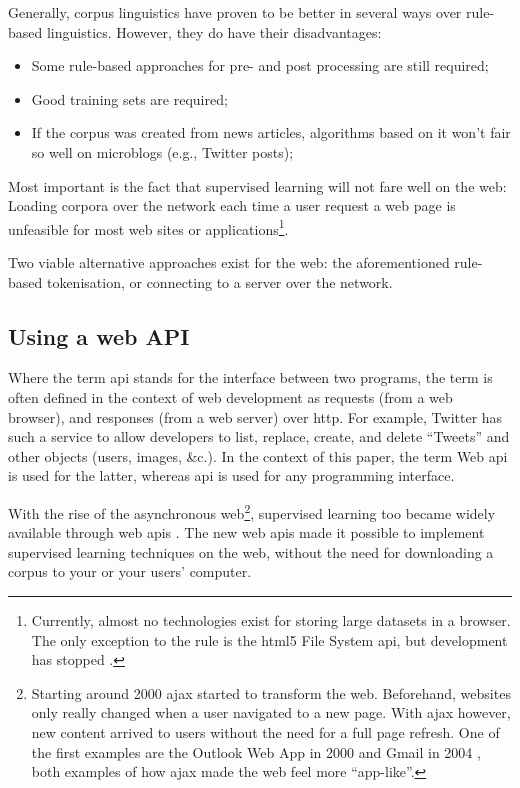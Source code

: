 Generally, corpus linguistics have proven to be better in several ways
over rule-based linguistics. However, they do have their disadvantages:

\begin{itemize}
\itemsep1pt\parskip0pt
\item
  Some rule-based approaches for pre- and post processing are still
  required;
\item
  Good training sets are required;
\item
  If the corpus was created from news articles, algorithms based on it
  won't fair so well on microblogs (e.g., Twitter posts);
\end{itemize}

Most important is the fact that supervised learning will not fare well
on the web: Loading corpora over the network each time a user request a
web page is unfeasible for most web sites or applications\footnote{Currently,
  almost no technologies exist for storing large datasets in a browser.
  The only exception to the rule is the \acrshort{html5} File System
  \acrshort{api}, but development has stopped
  \autocite{w3.org-filesystem-dead}.}.

Two viable alternative approaches exist for the web: the aforementioned
rule-based tokenisation, or connecting to a server over the network.

\subsection{Using a web API}\label{using-a-web}

Where the term \gls{api} stands for the interface between two programs,
the term is often defined in the context of web development as requests
(from a web browser), and responses (from a web server) over \gls{http}.
For example, Twitter has such a service to allow developers to list,
replace, create, and delete ``Tweets'' and other objects (users, images,
\&c.). In the context of this paper, the term Web \gls{api} is used for
the latter, whereas \gls{api} is used for any programming interface.

With the rise of the asynchronous web\footnote{Starting around 2000
  \gls{ajax} started to transform the web. Beforehand, websites only
  really changed when a user navigated to a new page. With \gls{ajax}
  however, new content arrived to users without the need for a full page
  refresh. One of the first examples are the Outlook Web App in 2000
  \autocite{technet-outlook-web-access} and Gmail in 2004
  \autocite{gmailblog-gmail-ajax}, both examples of how \gls{ajax} made
  the web feel more ``app-like''.}, supervised learning too became
widely available through web \glspl{api}
\autocites[e.g.,][]{textteaser-web-api}{wordnet-web-api}{textrazor-web-api}.
The new web \glspl{api} made it possible to implement supervised
learning techniques on the web, without the need for downloading a
corpus to your or your users' computer.


